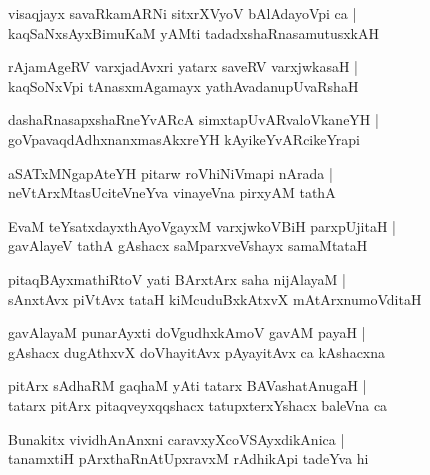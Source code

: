 \documentclass[twoside,12pt,openright]{book}
\newcounter{shloka}[chapter]
\begin{document}
\begin{shloka}%
visaqjayx savaRkamARNi sitxrXVyoV bAlAdayoVpi ca |\\
kaqSaNxsAyxBimuKaM yAMti tadadxshaRnasamutusxkAH 
\end{shloka}

\begin{shloka}%
rAjamAgeRV varxjadAvxri yatarx saveRV varxjwkasaH |\\
kaqSoNxVpi tAnasxmAgamayx yathAvadanupUvaRshaH 
\end{shloka}

\begin{shloka}%
dashaRnasapxshaRneYvARcA simxtapUvARvaloVkaneYH |\\
goVpavaqdAdhxnanxmasAkxreYH kAyikeYvARcikeYrapi
\end{shloka}

\begin{shloka}%
aSATxMNgapAteYH pitarw roVhiNiVmapi nArada |\\
neVtArxMtasUciteVneYva vinayeVna pirxyAM tathA 
\end{shloka}

\begin{shloka}%
EvaM teYsatxdayxthAyoVgayxM varxjwkoVBiH parxpUjitaH |\\
gavAlayeV tathA gAshacx saMparxveVshayx samaMtataH 
\end{shloka}

\begin{shloka}%
pitaqBAyxmathiRtoV yati BArxtArx saha nijAlayaM |\\
sAnxtAvx piVtAvx tataH kiMcuduBxkAtxvX mAtArxnumoVditaH 
\end{shloka}

\begin{shloka}%
gavAlayaM punarAyxti doVgudhxkAmoV gavAM payaH |\\
gAshacx dugAthxvX doVhayitAvx pAyayitAvx ca kAshacxna 
\end{shloka}

\begin{shloka}%
pitArx sAdhaRM gaqhaM yAti tatarx BAVashatAnugaH |\\
tatarx pitArx pitaqveyxqqshacx tatupxterxYshacx baleVna ca 
\end{shloka}

\begin{shloka}%
Bunakitx vividhAnAnxni caravxyXcoVSAyxdikAnica |\\
tanamxtiH pArxthaRnAtUpxravxM rAdhikApi tadeYva hi
\end{shloka}
\end{document}
